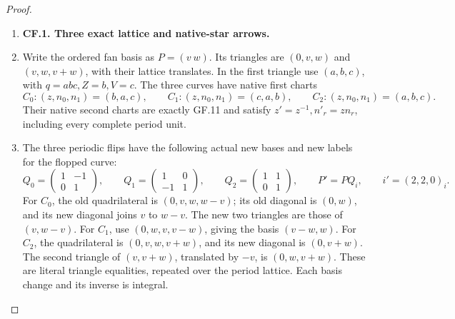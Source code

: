 \begin{proof}
\begin{enumerate}[label=\arabic*.]
\item \par\medskip\noindent\textbf{CF.1. Three exact lattice and native-star arrows.}\par\nopagebreak[4]

\item Write the ordered fan basis as \(P=(v\ w)\). Its triangles are
\((0,v,w)\) and \((v,w,v+w)\), with their lattice translates.
In the first triangle use \((a,b,c)\), with
\(q=abc, Z=b,V=c\). The three curves have native first charts
\[
 C_0:(z,n_0,n_1)=(b,a,c),\qquad
 C_1:(z,n_0,n_1)=(c,a,b),\qquad
 C_2:(z,n_0,n_1)=(a,b,c).                              \tag{P3K.59.CF.1}
\]
Their native second charts are exactly GF.11 and satisfy
\(z'=z^{-1},n'_r=zn_r\), including every complete period unit.

\item The three periodic flips have the following actual new bases and
new labels for the flopped curve:
\[
 Q_0=\begin{pmatrix}1&-1\\0&1\end{pmatrix},\qquad
 Q_1=\begin{pmatrix}1&0\\-1&1\end{pmatrix},\qquad
 Q_2=\begin{pmatrix}1&1\\0&1\end{pmatrix},
 \qquad P'=PQ_i,\qquad i'=(2,2,0)_i.                  \tag{P3K.59.CF.2}
\]
For \(C_0\), the old quadrilateral is
\((0,v,w,w-v)\); its old diagonal is \((0,w)\), and its new
diagonal joins \(v\) to \(w-v\). The new two triangles are those
of \((v,w-v)\). For \(C_1\), use
\((0,w,v,v-w)\), giving the basis \((v-w,w)\).
For \(C_2\), the quadrilateral is \((0,v,w,v+w)\), and its
new diagonal is \((0,v+w)\). The second triangle of
\((v,v+w)\), translated by \(-v\), is \((0,w,v+w)\).
These are literal triangle equalities, repeated over the period
lattice. Each basis change and its inverse is integral.


\end{enumerate}
\end{proof}
